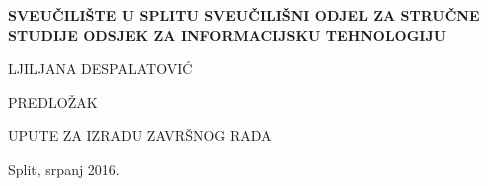 %
%
\begin{titlepage}
\bfseries
\headerdata
{SVEUČILIŠTE U SPLITU}
{SVEUČILIŠNI ODJEL ZA STRUČNE STUDIJE}
{ODSJEK ZA INFORMACIJSKU TEHNOLOGIJU}

\vspace*{6cm}
\begin{center}
{\Large LJILJANA DESPALATOVIĆ}

\vspace*{3cm}

{\large {PREDLOŽAK}}

\vspace*{0.5cm}
\Huge UPUTE ZA IZRADU ZAVRŠNOG RADA\\[1cm]

\end{center}
\begin{center}
\vfill
{\large Split, srpanj 2016.}
\end{center}
\end{titlepage}
%
%
